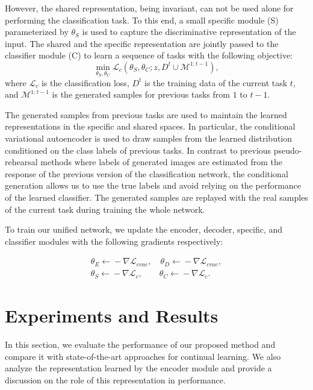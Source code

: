 \documentclass[letterpaper]{article} %
\begin{document}
However, the shared representation, being invariant, can not be used alone for performing the classification task. To this end, a small specific module (S) parameterized by $\theta_{S}$ is used to capture the discriminative representation of the input. The shared and the specific representation are jointly passed to the classifier module (C) to learn a sequence of tasks with the following objective:
\begin{equation}
 \min_{\theta_{S},\theta_{C}} \mathcal{L}_{c} (\theta_{S},\theta_{C};z, D^{t} \cup \mathcal{M}^{1:t-1}),
\label{classification_loss}
\end{equation}
where $\mathcal{L}_{c}$ is the classification loss, $D^{t}$ is the training data of the current task $t$, and $\mathcal{M}^{1:t-1}$ is the generated samples for previous tasks from $1$ to $t-1$. 

The generated samples from previous tasks are used to maintain the learned representations in the specific and shared spaces. In particular, the conditional variational autoencoder is used to draw samples from the learned distribution conditioned on the class labels of previous tasks. In contrast to previous pseudo-rehearsal methods where labels of generated images are estimated from the response of the previous version of the classification network, the conditional generation allows us to use the true labels and avoid relying on the performance of the learned classifier. The generated samples are replayed with the real samples of the current task during training the whole network. 

To train our unified network, we update the encoder, decoder, specific, and classifier modules with the following gradients respectively:

\begin{equation}
\label{gradient}
\begin{split}
  \theta_{E} \xleftarrow{} - \nabla \mathcal{L}_{cvae}, \quad
  \theta_{D} \xleftarrow{} - \nabla \mathcal{L}_{cvae},\\
  \theta_{S} \xleftarrow{} - \nabla \mathcal{L}_{c}, \quad \quad
  \theta_{C} \xleftarrow{} - \nabla \mathcal{L}_{c}.
\end{split}
\end{equation}


\section{Experiments and Results}
In this section, we evaluate the performance of our proposed method and compare it with state-of-the-art approaches for continual learning. We also analyze the representation learned by the encoder module and provide a discussion on the role of this representation in performance. 
\end{document}
